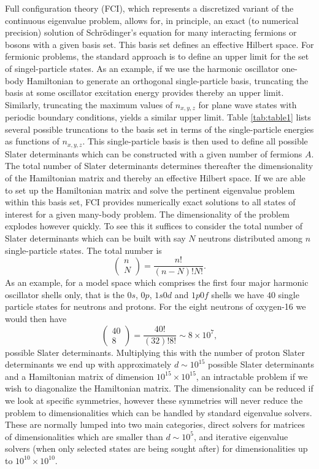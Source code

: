   Full configuration theory (FCI), which represents a discretized
  variant of the continuous eigenvalue problem, allows for, in
  principle, an exact (to numerical precision) solution of Schr\"odinger's equation
  for many interacting fermions or bosons with a given basis set. This
  basis set defines an effective Hilbert space.  For fermionic
  problems, the standard approach is to define an upper limit for the
  set of singel-particle states. As an example, if we use the harmonic
  oscillator one-body Hamiltonian to generate an orthogonal
  single-particle basis, truncating the basis at some oscillator
  excitation energy provides thereby an upper limit.  Similarly,
  truncating the maximum values of $n_{x,y,z}$ for plane wave states
  with periodic boundary conditions, yields a similar upper limit.
  Table \ref{tab:table1} lists several possible truncations to the
  basis set in terms of the single-particle energies as functions of
  $n_{x,y,z}$.  This single-particle basis is then used to define all
  possible Slater determinants which can be constructed with a given
  number of fermions $A$.  The total number of Slater determinants
  determines thereafter the dimensionality of the Hamiltonian matrix
  and thereby an effective Hilbert space. 
  If we are able to set up the Hamiltonian matrix
  and solve the pertinent eigenvalue problem within this basis set,
  FCI provides numerically exact solutions to all states of interest
  for a given many-body problem. The dimensionality of the problem
  explodes however quickly. To see this it suffices to consider
  the total number of Slater determinants which can be built with say
  $N$ neutrons distributed among $n$ single-particle states. The total number is
  \[
  \left (\begin{array}{c} n \\ N\end{array} \right)
    =\frac{n!}{(n-N)!N!}.
  \]
  As an example, for a model space which comprises the first four
  major harmonic oscillator shells only, that is the $0s$, $0p$,
  $1s0d$ and $1p0f$ shells we have $40$ single particle states for
  neutrons and protons.  For the eight neutrons of oxygen-16 we would
  then have
  \[
  \left (\begin{array}{c} 40 \\ 8\end{array} \right)
    =\frac{40!}{(32)!8!}\sim 8\times 10^{7},
  \]
  possible Slater determinants. Multiplying this with the number of
  proton Slater determinants we end up with approximately $d\sim 10^{15}$ 
  possible Slater determinants and a Hamiltonian matrix of
  dimension $10^{15}\times 10^{15}$, an intractable problem if we wish to diagonalize the Hamiltonian matrix. The
  dimensionality can be reduced if we look at specific symmetries,
  however these symmetries will never reduce the problem to
  dimensionalities which can be handled by standard eigenvalue
  solvers. These are normally lumped into two main categories, direct
  solvers for matrices of dimensionalities which are smaller than
  $d\sim 10^5$, and iterative eigenvalue solvers (when only selected
  states are being sought after) for dimensionalities up to
  $10^{10}\times 10^{10}$.

